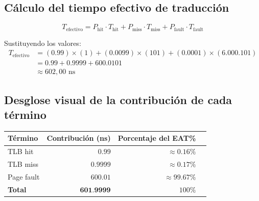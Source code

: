 \documentclass[12pt,letterpaper]{article}
\begin{document}
\subsection*{Cálculo del tiempo efectivo de traducción}

\begin{formulabox}
  \[
  T_{\text{efectivo}} =
  P_{\text{hit}} \cdot T_{\text{hit}}
  + P_{\text{miss}} \cdot T_{\text{miss}}
  + P_{\text{fault}} \cdot T_{\text{fault}}
  \]
\end{formulabox}

Sustituyendo los valores:
\begin{align*}
  T_{\text{efectivo}}
  &= (0{.}99)\times(1)
  + (0{.}0099)\times(101)
  + (0{.}0001)\times(6{.}000{.}101) \\[6pt]
  &= 0{.}99
  + 0{.}9999
  + 600{.}0101 \\[6pt]
  &\approx \boxed{602{,}00 \text{ ns}}
\end{align*}

\subsection*{Desglose visual de la contribución de cada término}

\begin{center}
\renewcommand{\arraystretch}{1.4}
\begin{tabular}{lrrl}
  \textbf{Término} & \textbf{Contribución (ns)} & \textbf{Porcentaje del EAT\%}\\
  \hline
  TLB hit & $0{.}99$ & $\approx 0{.}16\%$ \\
  TLB miss & $0{.}9999$ & $\approx 0{.}17\%$ \\
  Page fault & $600{.}01$ & $\approx 99{.}67\%$ \\
  \hline
  \textbf{Total} & $\mathbf{601{.}9999}$ & $100\%$ \\
\end{tabular}
\end{center}
\end{document}
